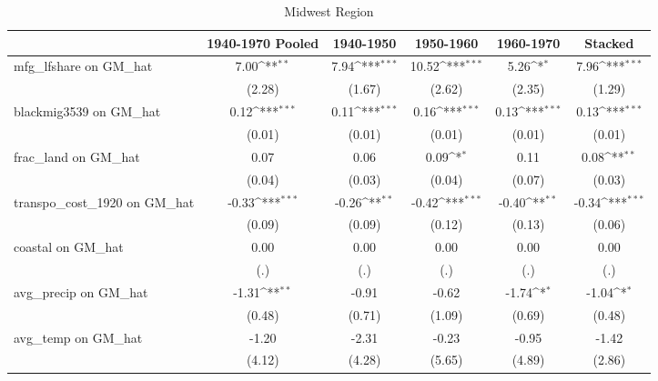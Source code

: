 \begin{table}[htbp]\centering
\def\sym#1{\ifmmode^{#1}\else\(^{#1}\)\fi}
\caption{Midwest Region}
\begin{tabular}{l*{5}{c}}
\toprule
                &\multicolumn{1}{c}{1940-1970 Pooled}&\multicolumn{1}{c}{1940-1950}&\multicolumn{1}{c}{1950-1960}&\multicolumn{1}{c}{1960-1970}&\multicolumn{1}{c}{Stacked}\\
\midrule
mfg\_lfshare on GM\_hat&     7.00\sym{**} &     7.94\sym{***}&    10.52\sym{***}&     5.26\sym{*}  &     7.96\sym{***}\\
                &   (2.28)         &   (1.67)         &   (2.62)         &   (2.35)         &   (1.29)         \\
\addlinespace
blackmig3539 on GM\_hat&     0.12\sym{***}&     0.11\sym{***}&     0.16\sym{***}&     0.13\sym{***}&     0.13\sym{***}\\
                &   (0.01)         &   (0.01)         &   (0.01)         &   (0.01)         &   (0.01)         \\
\addlinespace
frac\_land on GM\_hat&     0.07         &     0.06         &     0.09\sym{*}  &     0.11         &     0.08\sym{**} \\
                &   (0.04)         &   (0.03)         &   (0.04)         &   (0.07)         &   (0.03)         \\
\addlinespace
transpo\_cost\_1920 on GM\_hat&    -0.33\sym{***}&    -0.26\sym{**} &    -0.42\sym{***}&    -0.40\sym{**} &    -0.34\sym{***}\\
                &   (0.09)         &   (0.09)         &   (0.12)         &   (0.13)         &   (0.06)         \\
\addlinespace
coastal on GM\_hat&     0.00         &     0.00         &     0.00         &     0.00         &     0.00         \\
                &      (.)         &      (.)         &      (.)         &      (.)         &      (.)         \\
\addlinespace
avg\_precip on GM\_hat&    -1.31\sym{**} &    -0.91         &    -0.62         &    -1.74\sym{*}  &    -1.04\sym{*}  \\
                &   (0.48)         &   (0.71)         &   (1.09)         &   (0.69)         &   (0.48)         \\
\addlinespace
avg\_temp on GM\_hat&    -1.20         &    -2.31         &    -0.23         &    -0.95         &    -1.42         \\
                &   (4.12)         &   (4.28)         &   (5.65)         &   (4.89)         &   (2.86)         \\

\end{tabular}
\end{table}
